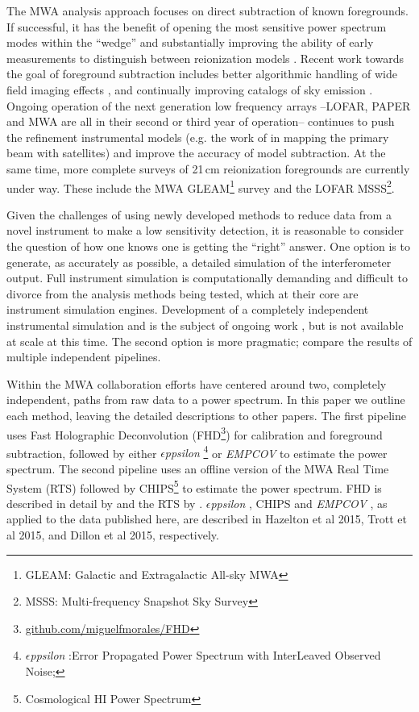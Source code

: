 \documentclass[preprint]{aastex}
\def\eppsilon{{\it $\epsilon$ppsilon }}
\def\empirical cov{\emph{EMPCOV }}
\def\chipscite{Trott et al 2015}
\def\eppsiloncite{Hazelton et al 2015}
\def\dilloncite{Dillon et al 2015}
\begin{document}
The MWA analysis approach focuses on direct subtraction of known foregrounds.  If successful, it has the benefit of opening the most sensitive power spectrum modes within the ``wedge'' and substantially improving the ability of early measurements to distinguish between reionization models \citep{Beardsley:2013p9952,Pober:2014p10390}. Recent work towards the goal of foreground subtraction includes better algorithmic handling of wide field imaging effects \citep{Tasse:2012p9459,Bhatnagar..2013ApJ,Sullivan:2012p9457,Ord:2010p8442}, and continually improving catalogs of sky emission \citep{deOliveiraCosta:2008p2242,Jacobs:2011p8438,Hurley-walker:2014p45,2014AAS...22342101M}. Ongoing operation of the next generation low frequency arrays --LOFAR, PAPER and MWA are all in their second or third year of operation-- continues to push the refinement instrumental models (e.g. the work of \cite{Neben:2015pxxx} in mapping the primary beam with satellites) and improve the accuracy of model subtraction.  At the same time, more complete surveys of 21\,cm reionization foregrounds are currently under way. These include the MWA GLEAM\footnote{GLEAM: Galactic and Extragalactic All-sky MWA} survey  and the LOFAR MSSS\footnote{MSSS: Multi-frequency Snapshot Sky Survey}.   %



Given the challenges of using newly developed methods to reduce data from a novel instrument to make a low sensitivity detection, it is reasonable to consider the question of how one knows one is getting the ``right'' answer.  One option is to generate, as accurately as possible, a detailed simulation of the interferometer output. Full instrument simulation is computationally demanding and difficult to divorce from the analysis methods being tested, which at their core are instrument simulation engines. Development of a completely independent instrumental simulation and is the subject of ongoing work \citep[see e.g..][]{2015arXiv150207596T}, but is not available at scale at this time.  The second option is more pragmatic; compare the results of multiple independent pipelines.  

Within the MWA collaboration efforts have centered around two, completely independent, paths from raw data to a power spectrum.  In this paper we outline each method, leaving the detailed descriptions to other papers.   The first pipeline uses Fast Holographic Deconvolution (FHD\footnote{\url{github.com/miguelfmorales/FHD}}) for calibration and foreground subtraction, followed by either \eppsilon\footnote{\eppsilon:Error Propagated Power Spectrum with InterLeaved Observed Noise;} or \empirical cov to estimate the power spectrum.  The second pipeline uses an offline version of the MWA Real Time System (RTS) followed by CHIPS\footnote{Cosmological HI Power Spectrum} to estimate the power spectrum.  FHD is described in detail by \cite{Sullivan:2012p9457} and the RTS by \cite{Ord:2010p8442}. \eppsilon, CHIPS and \empirical cov, as applied to the data published here, are described in \eppsiloncite, \chipscite, and \dilloncite, respectively.
\end{document}
